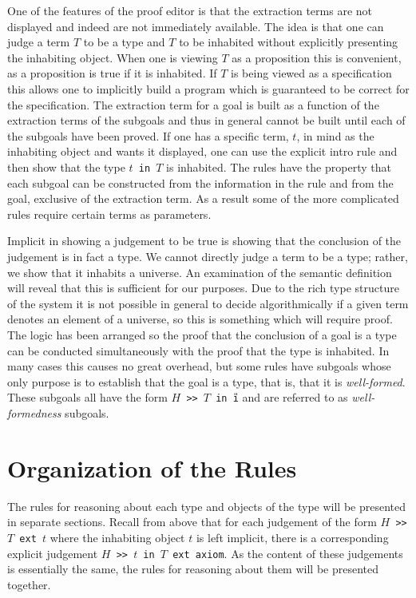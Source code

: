 One of the features of the proof editor is that
the extraction terms are not
displayed and indeed are not immediately available.
The idea is that one can judge a term $T$ to be a type and  $T$ to be
inhabited without explicitly presenting the inhabiting object.
When one is viewing $T$ as a proposition this is convenient, as a
proposition is true if it is inhabited.
If $T$ is being viewed as a specification this allows one to
implicitly
build a program which is guaranteed to be correct for the specification.
The extraction term for a goal is built as a function of the extraction
terms of the subgoals and thus in general cannot be built until each of
the subgoals have been proved.
If one has a specific term, $t$, in mind as the inhabiting object and wants
it displayed, one can use the explicit intro rule and then show that the
type {\tt $t$ in $T$} is inhabited.
The rules have the property that each subgoal can be constructed from the
information in the rule and from the goal, exclusive of the extraction term.
As a result some of the more complicated rules require certain terms as
parameters.

Implicit in showing a judgement to be true is showing that the conclusion of
the judgement is in fact a type.
We cannot directly judge a term to be a type; rather, we show that it
inhabits a universe.
An examination of the semantic definition will reveal that this is
sufficient for our purposes.
Due to the rich type structure of the system it is not possible in general
to decide algorithmically if a given term denotes an element of a universe,
so this is something which will require proof.
The logic has been arranged so the proof that the conclusion of a goal
is a type can be conducted simultaneously with the proof that the type is
inhabited.
In many cases this causes no great overhead,
but some rules have subgoals whose only purpose is to establish that the
goal is a type, that is, that it is {\em well-formed}.
These subgoals all have the form {\tt $H$ >> $T$ in \U{i}} and are referred
to as {\em well-formedness} subgoals.

\section{Organization of the Rules}
The rules for reasoning about each type and objects of the type will be
presented in separate sections.
Recall from above that for each judgement of the form
\mbox{\tt $H$ >> $T$ ext $t$} where the inhabiting object $t$ is left
implicit, there is a corresponding
explicit judgement
\mbox{\tt $H$ >> $t$ in $T$ ext axiom}.
As the content of these judgements is essentially the same,
the rules for reasoning about them will be presented together.

